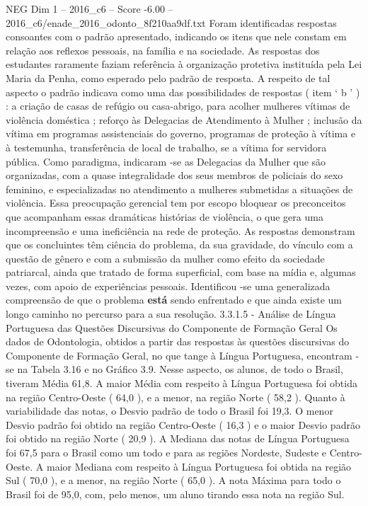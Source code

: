 \begin{textsample}{NEG Dim 1 – 2016\_c6 – Score -6.00 – 2016\_c6/enade\_2016\_odonto\_8f210aa9df.txt}
Foram identificadas respostas consoantes com o padrão apresentado, indicando os itens que nele constam em relação aos reflexos pessoais, na família e na sociedade.
As respostas dos estudantes raramente faziam referência à organização protetiva instituída pela Lei Maria da Penha, como esperado pelo padrão de resposta.
A respeito de tal aspecto o padrão indicava como uma das possibilidades de respostas ( item ‘ b ’ ) : a criação de casas de refúgio ou casa-abrigo, para acolher mulheres vítimas de violência doméstica ; reforço às Delegacias de Atendimento à Mulher ; inclusão da vítima em programas assistenciais do governo, programas de proteção à vítima e à testemunha, transferência de local de trabalho, se a vítima for servidora pública.
Como paradigma, indicaram -se as Delegacias da Mulher que são organizadas, com a quase integralidade dos seus membros de policiais do sexo feminino, e especializadas no atendimento a mulheres submetidas a situações de violência.
Essa preocupação gerencial tem por escopo bloquear os preconceitos que acompanham essas dramáticas histórias de violência, o que gera uma incompreensão e uma ineficiência na rede de proteção.
As respostas demonstram que os concluintes têm ciência do problema, da sua gravidade, do vínculo com a questão de gênero e com a submissão da mulher como efeito da sociedade patriarcal, ainda que tratado de forma superficial, com base na mídia e, algumas vezes, com apoio de experiências pessoais.
Identificou -se uma generalizada compreensão de que o problema \textbf{está} sendo enfrentado e que ainda existe um longo caminho no percurso para a sua resolução. 3.3.1.5 - Análise de Língua Portuguesa das Questões Discursivas do Componente de Formação Geral Os dados de Odontologia, obtidos a partir das respostas às questões discursivas do Componente de Formação Geral, no que tange à Língua Portuguesa, encontram -se na Tabela 3.16 e no Gráfico 3.9.
Nesse aspecto, os alunos, de todo o Brasil, tiveram Média 61,8.
A maior Média com respeito à Língua Portuguesa foi obtida na região Centro-Oeste ( 64,0 ), e a menor, na região Norte ( 58,2 ).
Quanto à variabilidade das notas, o Desvio padrão de todo o Brasil foi 19,3.
O menor Desvio padrão foi obtido na região Centro-Oeste ( 16,3 ) e o maior Desvio padrão foi obtido na região Norte ( 20,9 ).
A Mediana das notas de Língua Portuguesa foi 67,5 para o Brasil como um todo e para as regiões Nordeste, Sudeste e Centro-Oeste.
A maior Mediana com respeito à Língua Portuguesa foi obtida na região Sul ( 70,0 ), e a menor, na região Norte ( 65,0 ).
A nota Máxima para todo o Brasil foi de 95,0, com, pelo menos, um aluno tirando essa nota na região Sul.

\end{textsample}
